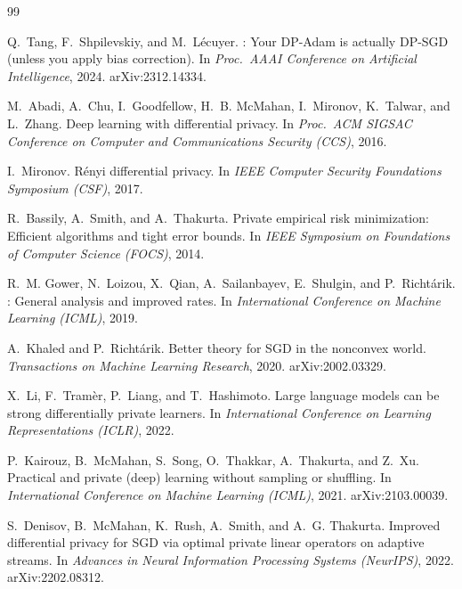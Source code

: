 \documentclass[11pt]{article}
\theoremstyle{plain}
\theoremstyle{definition}
\theoremstyle{remark}
\begin{document}
\begin{thebibliography}{99}

Q.~Tang, F.~Shpilevskiy, and M.~L\'ecuyer.
: Your {DP-Adam} is actually {DP-SGD} (unless you apply bias correction).
\newblock In \emph{Proc.\ AAAI Conference on Artificial Intelligence}, 2024.
\newblock arXiv:2312.14334.

M.~Abadi, A.~Chu, I.~Goodfellow, H.~B. McMahan, I.~Mironov, K.~Talwar, and L.~Zhang.
\newblock Deep learning with differential privacy.
\newblock In \emph{Proc.\ ACM SIGSAC Conference on Computer and Communications Security (CCS)}, 2016.

I.~Mironov.
\newblock R\'enyi differential privacy.
\newblock In \emph{IEEE Computer Security Foundations Symposium (CSF)}, 2017.

R.~Bassily, A.~Smith, and A.~Thakurta.
\newblock Private empirical risk minimization: Efficient algorithms and tight error bounds.
\newblock In \emph{IEEE Symposium on Foundations of Computer Science (FOCS)}, 2014.

R.~M. Gower, N.~Loizou, X.~Qian, A.~Sailanbayev, E.~Shulgin, and P.~Richt\'arik.
: General analysis and improved rates.
\newblock In \emph{International Conference on Machine Learning (ICML)}, 2019.

A.~Khaled and P.~Richt\'arik.
\newblock Better theory for {SGD} in the nonconvex world.
\newblock \emph{Transactions on Machine Learning Research}, 2020.
\newblock arXiv:2002.03329.

X.~Li, F.~Tram\`er, P.~Liang, and T.~Hashimoto.
\newblock Large language models can be strong differentially private learners.
\newblock In \emph{International Conference on Learning Representations (ICLR)}, 2022.

P.~Kairouz, B.~McMahan, S.~Song, O.~Thakkar, A.~Thakurta, and Z.~Xu.
\newblock Practical and private (deep) learning without sampling or shuffling.
\newblock In \emph{International Conference on Machine Learning (ICML)}, 2021.
\newblock arXiv:2103.00039.

S.~Denisov, B.~McMahan, K.~Rush, A.~Smith, and A.~G. Thakurta.
\newblock Improved differential privacy for {SGD} via optimal private linear operators on adaptive streams.
\newblock In \emph{Advances in Neural Information Processing Systems (NeurIPS)}, 2022.
\newblock arXiv:2202.08312.


\end{thebibliography}
\end{document}
